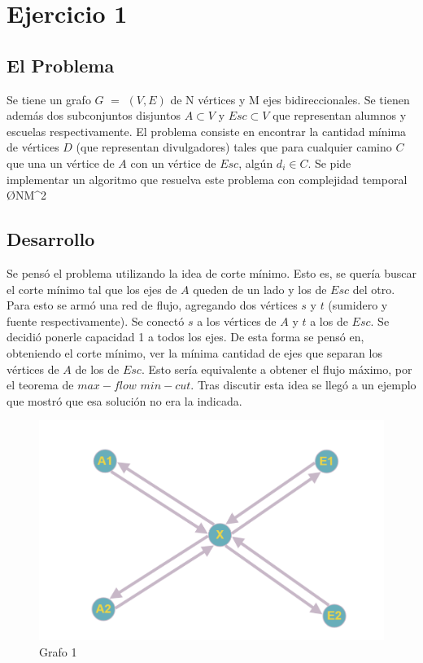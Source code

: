 \section{Ejercicio 1}
\subsection{El Problema}

Se tiene un grafo $G$ $=$ $(V,E)$ de N vértices y M ejes bidireccionales. Se tienen además dos subconjuntos disjuntos $A \subset V$ y $Esc \subset V$ que representan alumnos y escuelas respectivamente. El problema consiste en encontrar la cantidad mínima de vértices $D$ (que representan divulgadores)  tales que para cualquier camino $C$ que una un vértice de $A$ con un vértice de $Esc$, algún $d_i \in C$. Se pide implementar un algoritmo que resuelva este problema con complejidad temporal \O{NM^2}

\subsection{Desarrollo}

Se pensó el problema utilizando la idea de corte mínimo. Esto es, se quería buscar el corte mínimo tal que los ejes de $A$ queden de un lado y los de $Esc$ del otro. Para esto se armó una red de flujo, agregando dos vértices $s$ y $t$ (sumidero y fuente respectivamente). Se conectó $s$ a los vértices de $A$ y $t$ a los de $Esc$. Se decidió ponerle capacidad 1 a todos los ejes. De esta forma se pensó en, obteniendo el corte mínimo, ver la mínima cantidad de ejes que separan los vértices de $A$ de los de $Esc$. Esto sería equivalente a obtener el flujo máximo, por el teorema de $max-flow$ $min-cut$. Tras discutir esta idea se llegó a un ejemplo que mostró que esa solución no era la indicada.


\begin{figure}[H]
\centering
\includegraphics[width=15cm]{Imagenes/Ej1a.png}
\caption{Grafo 1}
\end{figure}

